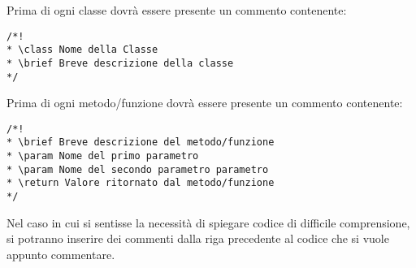 Prima di ogni classe dovrà essere presente un commento contenente:
\begin{lstlisting}
/*!
* \class Nome della Classe
* \brief Breve descrizione della classe
*/
\end{lstlisting}

Prima di ogni metodo/funzione dovrà essere presente un commento contenente: 
\begin{lstlisting}
/*!
* \brief Breve descrizione del metodo/funzione
* \param Nome del primo parametro
* \param Nome del secondo parametro parametro
* \return Valore ritornato dal metodo/funzione
*/
\end{lstlisting}

Nel caso in cui si sentisse la necessità di spiegare codice di difficile comprensione, si potranno inserire dei commenti dalla riga precedente al codice che si vuole appunto commentare.